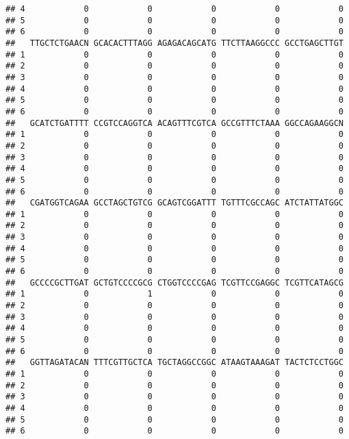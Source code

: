 \documentclass[]{article}
\begin{document}
\begin{verbatim}
## 4            0            0            0            0            0
## 5            0            0            0            0            0
## 6            0            0            0            0            0
##   TTGCTCTGAACN GCACACTTTAGG AGAGACAGCATG TTCTTAAGGCCC GCCTGAGCTTGT
## 1            0            0            0            0            0
## 2            0            0            0            0            0
## 3            0            0            0            0            0
## 4            0            0            0            0            0
## 5            0            0            0            0            0
## 6            0            0            0            0            0
##   GCATCTGATTTT CCGTCCAGGTCA ACAGTTTCGTCA GCCGTTTCTAAA GGCCAGAAGGCN
## 1            0            0            0            0            0
## 2            0            0            0            0            0
## 3            0            0            0            0            0
## 4            0            0            0            0            0
## 5            0            0            0            0            0
## 6            0            0            0            0            0
##   CGATGGTCAGAA GCCTAGCTGTCG GCAGTCGGATTT TGTTTCGCCAGC ATCTATTATGGC
## 1            0            0            0            0            0
## 2            0            0            0            0            0
## 3            0            0            0            0            0
## 4            0            0            0            0            0
## 5            0            0            0            0            0
## 6            0            0            0            0            0
##   GCCCCGCTTGAT GCTGTCCCCGCG CTGGTCCCCGAG TCGTTCCGAGGC TCGTTCATAGCG
## 1            0            1            0            0            0
## 2            0            0            0            0            0
## 3            0            0            0            0            0
## 4            0            0            0            0            0
## 5            0            0            0            0            0
## 6            0            0            0            0            0
##   GGTTAGATACAN TTTCGTTGCTCA TGCTAGGCCGGC ATAAGTAAAGAT TACTCTCCTGGC
## 1            0            0            0            0            0
## 2            0            0            0            0            0
## 3            0            0            0            0            0
## 4            0            0            0            0            0
## 5            0            0            0            0            0
## 6            0            0            0            0            0

\end{verbatim}
\end{document}
